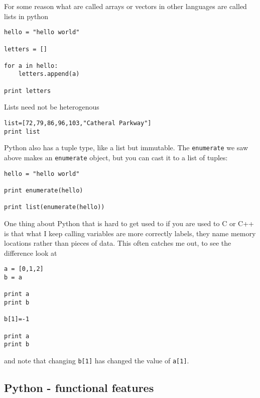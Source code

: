 \documentclass[11pt,a4paper]{scrartcl}
\begin{document}
For some reason what are called arrays or vectors in other languages
are called lists in python
\begin{lstlisting}[numbers=right]
hello = "hello world"

letters = []

for a in hello:
    letters.append(a)

print letters
\end{lstlisting}
Lists need not be heterogenous
\begin{lstlisting}[numbers=right]
list=[72,79,86,96,103,"Catheral Parkway"]
print list
\end{lstlisting}
Python also has a tuple type, like a list but immutable. The
\texttt{enumerate} we saw above makes an \texttt{enumerate} object,
but you can cast it to a list of tuples:
\begin{lstlisting}[numbers=right]
hello = "hello world"

print enumerate(hello) 

print list(enumerate(hello)) 
\end{lstlisting}

One thing about Python that is hard to get used to if you are used to
C or C++ is that what I keep calling variables are more correctly
labels, they name memory locations rather than pieces of data. This
often catches me out, to see the difference look at
\begin{lstlisting}[numbers=right]
a = [0,1,2]
b = a

print a
print b

b[1]=-1

print a
print b
\end{lstlisting}
and note that changing \texttt{b[1]} has changed the value of \texttt{a[1]}.

\subsection*{Python - functional features}
\end{document}
